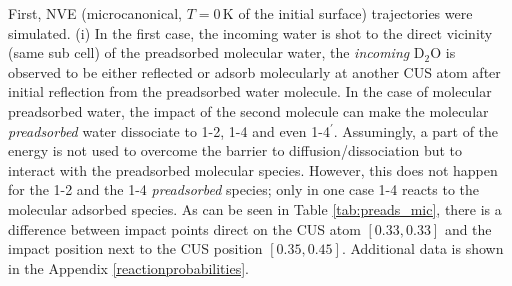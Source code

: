 \documentclass[11pt,DIV=13,BCOR=5mm,a4paper,headinclude]{scrbook}
\begin{document}
First, NVE (microcanonical, $T=0\,$K of the initial surface) trajectories were simulated.
(i) In the first case, the incoming water is shot to the direct vicinity (same sub cell) of the preadsorbed molecular water, the  \textit{incoming} D$_2$O is observed to be either reflected or adsorb molecularly at another CUS atom after initial reflection from the preadsorbed water molecule.
In the case of molecular preadsorbed water, the impact of the second molecule can make the molecular \textit{preadsorbed} water dissociate to 1-2, 1-4 and even 1-4$^\prime$.
Assumingly, a part of the energy is not used to overcome the barrier to diffusion/dissociation but to interact with the preadsorbed molecular species.
However, this does not happen for the 1-2 and the 1-4 \textit{preadsorbed} species; only in one case 1-4 reacts to the molecular adsorbed species.
As can be seen in Table \ref{tab:preads_mic}, there is a difference between impact points direct on the CUS atom $[0.33,0.33]$ and the impact position next to the CUS position $[0.35,0.45]$.
Additional data is shown in the Appendix \ref{reactionprobabilities}.
\end{document}
